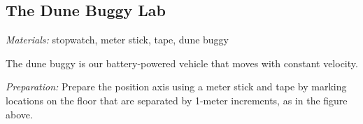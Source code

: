 \documentclass[]{exam}
\begin{document}
\clearpage

\subsection*{The Dune Buggy Lab}

\noindent \textit{Materials:} stopwatch, meter stick, tape, dune buggy 

\medskip

\noindent The dune buggy is our battery-powered vehicle that moves with constant velocity. 

\begin{center}
\end{center}



\noindent \textit{Preparation:} Prepare the position axis using a meter stick and tape by marking locations on the floor that are separated by 1-meter increments, as in the figure above.
\end{document}
